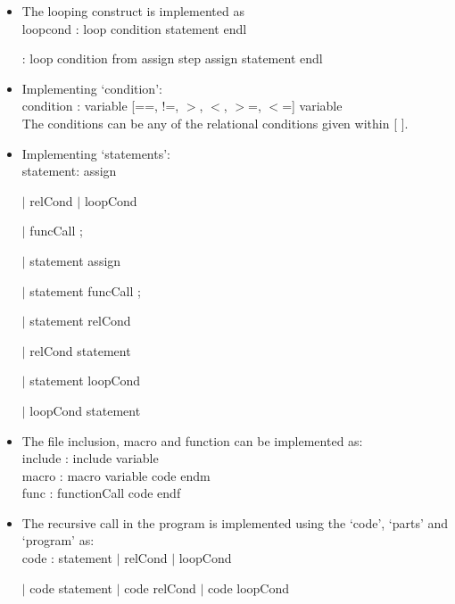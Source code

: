 \documentclass[12pt, oneside, a4paper]{article}
\begin{document}
\begin{itemize}
\item The looping construct is implemented as\\
loopcond : loop condition statement endl

\hspace{.5in} : loop condition from assign step assign statement endl\\

\item Implementing `condition':\\
condition : variable [==, !=, $>$, $<$, $>$=, $<$=] variable\\
The conditions can be any of the relational conditions given within [ ].\\

\item Implementing `statements':\\
statement:	assign

\hspace{.75in}$|$	relCond $|$	loopCond 

\hspace{.75in}$|$	funcCall ;

\hspace{.75in}$|$	statement assign

\hspace{.75in}$|$	statement funcCall ;

\hspace{.75in}$|$	statement relCond

\hspace{.75in}$|$	relCond statement

\hspace{.75in}$|$	statement loopCond

\hspace{.75in}$|$	loopCond statement

\item The file inclusion, macro and function can be implemented as:\\
include : include variable\\
macro : macro variable code endm\\
func : functionCall code endf\\

\item The recursive call in the program is implemented using the `code', `parts' and `program' as:\\
code : statement $|$ relCond $|$ loopCond

\hspace{.5in}$|$ code statement $|$	code relCond $|$	code loopCond\\


\end{itemize}
\end{document}
